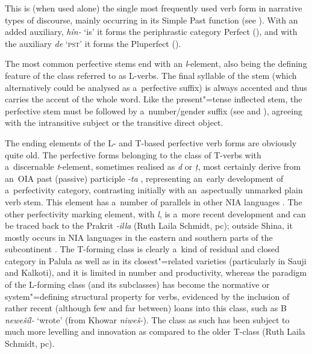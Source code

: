  This is (when used alone) the single most frequently used verb form in
narrative types of discourse, mainly occurring in its Simple Past function (see ). With an added auxiliary, \textit{hín-} `is' it forms the periphrastic category Perfect (), and with the auxiliary \textit{de} `\textsc{pst}' it forms the Pluperfect ().


The most common perfective stems end with an \textit{l}-element,
also being the defining feature of the class referred to as L-verbs. The final syllable of the stem
(which alternatively could be analysed as a~perfective suffix) is always accented and thus carries
the accent of the whole word. Like the present"=tense inflected stem, the perfective stem must be
followed by a~number/gender suffix (see  and ), agreeing with
the intransitive subject or the transitive direct object.



The ending elements of the L- and T-based perfective verb forms are obviously quite old. The perfective forms belonging to the class of T-verbs with a~discernable \textit{t}-element, sometimes realised as \textit{d} or \textit{ṭ}, most certainly derive from an~OIA past (passive) participle \textit{-ta} \citep[952]{whitney1960}, representing an~early development of a~perfectivity category, contrasting initially with an~aspectually unmarked plain verb stem. This element has a~number of parallels in other NIA languages \citep[269, 272]{masica1991}. The other perfectivity marking element, with \textit{l}, is a~more recent development and can be traced back to the Prakrit \textit{-illa} (Ruth Laila Schmidt, pc); outside Shina, it mostly occurs in NIA languages in the eastern and southern parts of the subcontinent \citep[270]{masica1991}. The T-forming class is clearly a~kind of residual and closed category in Palula as well as in its closest"=related varieties (particularly in Sauji and Kalkoti), and it is limited in number and productivity, whereas the paradigm of the L-forming class (and its subclasses) has become the normative or system"=defining structural property \citep[104]{mcmahon1994} for verbs, evidenced by the inclusion of rather recent (although few and far between) loans into this class, such as B \textit{newešíl-} `wrote' (from Khowar \textit{niweš-}). The class as such has been subject to much more levelling and innovation as compared to the older T-class (Ruth Laila Schmidt, pc).


